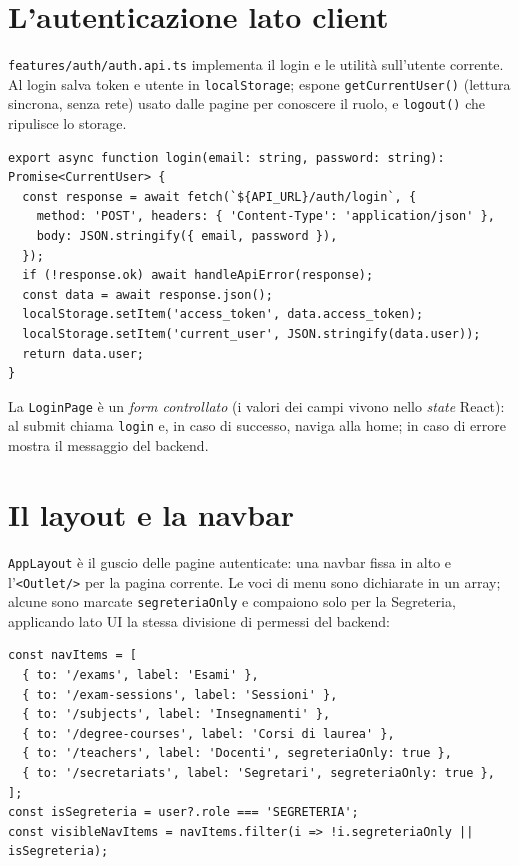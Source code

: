 \documentclass[11pt,a4paper,oneside]{report}
\newcommand{\code}[1]{\texttt{\small #1}}
\newcommand{\file}[1]{\texttt{\small #1}}
\begin{document}
\section{L'autenticazione lato client}
\file{features/auth/auth.api.ts} implementa il login e le utilità sull'utente
corrente. Al login salva token e utente in \code{localStorage}; espone
\code{getCurrentUser()} (lettura sincrona, senza rete) usato dalle pagine per
conoscere il ruolo, e \code{logout()} che ripulisce lo storage.

\begin{lstlisting}[caption={\code{login} (estratto di \file{auth.api.ts}).}]
export async function login(email: string, password: string): Promise<CurrentUser> {
  const response = await fetch(`${API_URL}/auth/login`, {
    method: 'POST', headers: { 'Content-Type': 'application/json' },
    body: JSON.stringify({ email, password }),
  });
  if (!response.ok) await handleApiError(response);
  const data = await response.json();
  localStorage.setItem('access_token', data.access_token);
  localStorage.setItem('current_user', JSON.stringify(data.user));
  return data.user;
}
\end{lstlisting}

La \code{LoginPage} è un \emph{form controllato} (i valori dei campi vivono nello
\emph{state} React): al submit chiama \code{login} e, in caso di successo,
naviga alla home; in caso di errore mostra il messaggio del backend.

\section{Il layout e la navbar}
\code{AppLayout} è il guscio delle pagine autenticate: una navbar fissa in alto e
l'\code{<Outlet/>} per la pagina corrente. Le voci di menu sono dichiarate in un
array; alcune sono marcate \code{segreteriaOnly} e compaiono solo per la
Segreteria, applicando lato UI la stessa divisione di permessi del backend:

\begin{lstlisting}[caption={Voci di navbar e filtro per ruolo (estratto).}]
const navItems = [
  { to: '/exams', label: 'Esami' },
  { to: '/exam-sessions', label: 'Sessioni' },
  { to: '/subjects', label: 'Insegnamenti' },
  { to: '/degree-courses', label: 'Corsi di laurea' },
  { to: '/teachers', label: 'Docenti', segreteriaOnly: true },
  { to: '/secretariats', label: 'Segretari', segreteriaOnly: true },
];
const isSegreteria = user?.role === 'SEGRETERIA';
const visibleNavItems = navItems.filter(i => !i.segreteriaOnly || isSegreteria);
\end{lstlisting}
\end{document}
